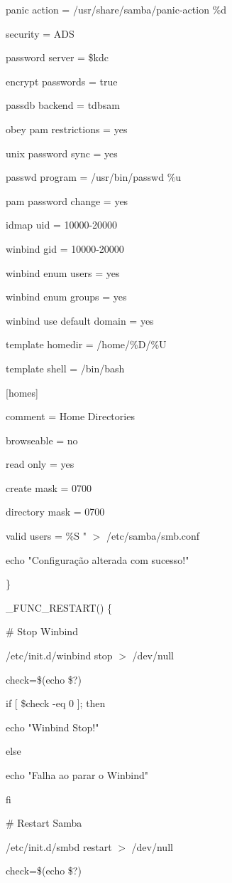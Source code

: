 {      panic action = /usr/share/samba/panic-action \%d

      security = ADS

      password server = \$kdc

      encrypt passwords = true

      passdb backend = tdbsam

      obey pam restrictions = yes

      unix password sync = yes

      passwd program = /usr/bin/passwd \%u
      
      pam password change = yes

      idmap uid = 10000-20000

      winbind gid = 10000-20000

      winbind enum users = yes

      winbind enum groups = yes

      winbind use default domain = yes

      template homedir = /home/\%D/\%U

      template shell = /bin/bash

   [homes]

      comment = Home Directories

      browseable = no

      read only = yes

      create mask = 0700

      directory mask = 0700

      valid users = \%S " $>$ /etc/samba/smb.conf

   echo "Configuração alterada com sucesso!"

\}

\_FUNC\_RESTART() \{

        \# Stop Winbind

        /etc/init.d/winbind stop $>$ /dev/null

        check=\$(echo \$?)

   if [ \$check -eq 0 ]; then

      echo "Winbind Stop!"

   else

      echo "Falha ao parar o Winbind"

   fi

     \# Restart Samba

     /etc/init.d/smbd restart $>$ /dev/null

     check=\$(echo \$?)

}
